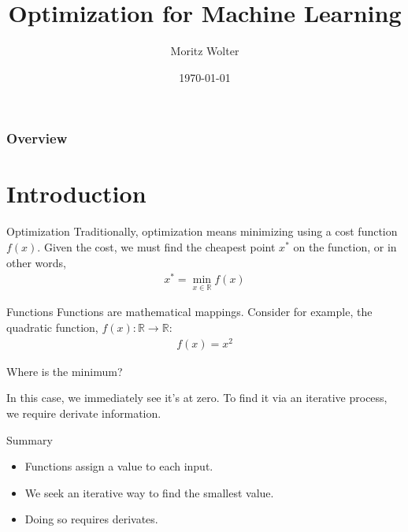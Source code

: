 \documentclass{beamer}
\title{Optimization for Machine Learning}
\institute{High-Performance Computing and Analytics Lab, Uni Bonn}
\author{Moritz Wolter}
\date{\today}
\begin{document}
    \maketitle

    \begin{frame}
    \frametitle{Overview} 
    \tableofcontents
    \end{frame}

    \section{Introduction}
    \begin{frame}{Optimization}
      Traditionally, optimization means minimizing using a cost function $f(x)$.
      Given the cost, we must find the cheapest point $x^*$ on the function,
      or in other words,
      \begin{align}
       x^* = \min_{x \in \mathbb{R}} f(x)        
      \end{align}
    \end{frame}

    \begin{frame}{Functions}
      Functions are mathematical mappings. Consider for example, the quadratic function,
      $f(x): \mathbb{R} \rightarrow \mathbb{R}$:
      \begin{align}
        f(x) = x^2
      \end{align}

    \begin{figure}
      
    \end{figure}
    \end{frame}

    \begin{frame}{Where is the minimum?}
      \begin{figure}
        
      \end{figure}
      In this case, we immediately see it's at zero. To find it via an iterative process, we require derivate information.
    \end{frame}

    \begin{frame}{Summary}
      \begin{itemize}
        \item Functions assign a value to each input.
        \item We seek an iterative way to find the smallest value.
        \item Doing so requires derivates.
      \end{itemize}
    \end{frame}
\end{document}

